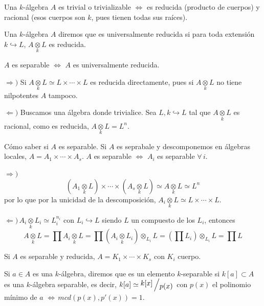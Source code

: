 \begin{prop}
     Una $k$-\'algebra $A$ es trivial o trivializable $\iff$ es  reducida (producto de cuerpos) y racional (esos cuerpos son $k$, pues tienen todas sus ra\'ices). 
\end{prop}
\begin{defi}
    Una $k$-\'algebra $A$ diremos que es universalmente reducida si para toda extensi\'on $k \hookrightarrow L$, $A\underset{k}{\otimes} L$ es reducida. 
\end{defi}
\begin{prop}
    $A$ es separable $\iff$ $A$ es universalmente reducida. 
\end{prop}
\begin{dem}
    $\Rightarrow)$ Si $A\underset{k}{\otimes} L\simeq L \times \cdots \times L$ es reducida directamente, pues si $A \underset{k}{\otimes} L $ no tiene nilpotentes $A$ tampoco.

    $\Leftarrow)$  Buscamos una \'algebra donde trivialice. Sea $L, k \hookrightarrow L$ tal que $A\underset{k}{\otimes} L$ es racional, como es reducida, $A \underset{k}{\otimes} L = L^n$. 
\end{dem}
\begin{prop}
    C\'omo saber si $A$ es separable. Si $A$ es seprabale y descomponemos en \'algebras locales, $A = A_1 \times \cdots \times A_s$. $A$ es separable $\iff$ $A_i$ es separable $\forall \, i$. 
    \begin{dem} $\Rightarrow)$
        $$(A_1 \underset{k}{\otimes} L )\times \cdots \times (A_s \underset{k}{\otimes} L) \simeq  A\underset{k}{\otimes} L \simeq L^n$$ 
        por lo que por la unicidad de la descomposici\'on, $A_i \underset{k}{\otimes} L \simeq L \times \cdots \times L$. 

        $\Leftarrow) \, A_i \underset{k}{\otimes} L_i \simeq L_i^{n_i}$ con $L_i \hookrightarrow L$ siendo $L$ un compuesto de los $L_i$, entonces 
        $$A \underset{k}{\otimes} L = \prod A_i \underset{k}{\otimes} L =\prod (A_i \underset{k}{\otimes} L_i) \otimes_{L_i} L = \left(\prod L_i \right) \otimes_{L_i} L = \prod L$$
    \end{dem}
\end{prop}
\begin{prop}
    Si $A$ es separable y reducida, $A = K_1 \times \cdots \times K_s$ con $K_i$ cuerpo. 
\end{prop}
\begin{prop}
    Si $a\in A$ es una $k$-\'algebra, diremos que es un elemento $k$-separable si $k[a]\subset A$ es una $k$-\'algebra separable, es decir, $k[a]\simeq \modulo{k[x]}{p(x)}$ con $p(x)$ el polinomio m\'inimo de $a$ $\iff \, mcd(p(x),p'(x))=1$. 
\end{prop}
